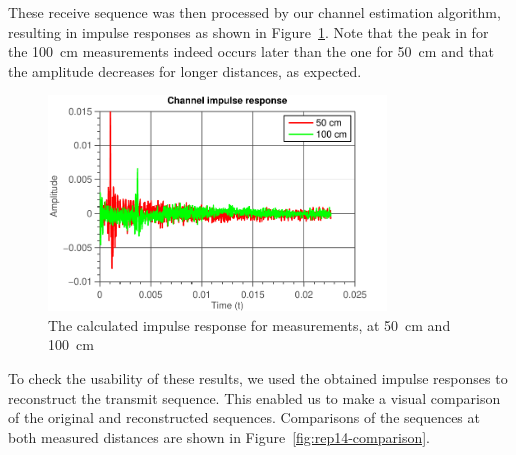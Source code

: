 \documentclass[11pt,titlepage]{report}
\begin{document}
These receive sequence was then processed by our channel estimation algorithm, resulting in impulse responses as shown in Figure~\ref{fig:rep14-impulse}. Note that the peak in for the \SI{100}{cm} measurements indeed occurs later than the one for \SI{50}{cm} and that the amplitude decreases for longer distances, as expected.

\begin{figure}[H]
	\centering
	\includegraphics[width=0.8\textwidth]{../../deliverable-7-resources/figures/ass-1/report-14-15/ass-1-report-14-impulse-responses.pdf}
	\caption{The calculated impulse response for measurements, at \SI{50}{cm} and \SI{100}{cm}}
	\label{fig:rep14-impulse}
\end{figure}

To check the usability of these results, we used the obtained impulse responses to reconstruct the transmit sequence. This enabled us to make a visual comparison of the original and reconstructed sequences. Comparisons of the sequences at both measured distances are shown in Figure~\ref{fig:rep14-comparison}.
\end{document}
